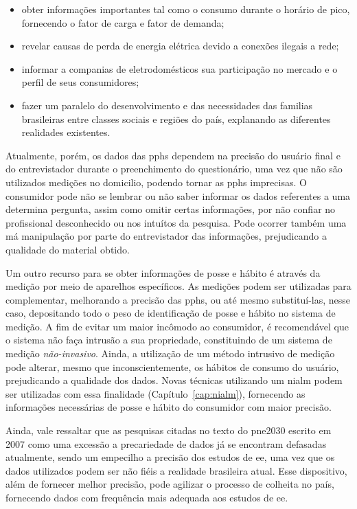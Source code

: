 \begin{itemize}
\item obter informações importantes tal como o consumo durante o horário de pico,
fornecendo o fator de carga e fator de demanda;
\item revelar causas de perda de energia elétrica devido a conexões ilegais a
rede;
\item informar a companias de eletrodomésticos sua participação no mercado e 
o perfil de seus consumidores;
\item fazer um paralelo do desenvolvimento e das necessidades das familias 
brasileiras entre classes sociais e regiões do país, explanando as 
diferentes realidades existentes.
\end{itemize}

Atualmente, porém, os dados das \glspl{pph} dependem
na precisão do usuário final e do entrevistador durante 
o preenchimento do questionário, uma vez que não são utilizados 
medições no domicilio, podendo tornar as \glspl{pph}
imprecisas. O consumidor pode não se lembrar ou não saber informar os dados
referentes a uma determina pergunta, assim como omitir certas informações, 
por não confiar no profissional desconhecido ou nos intuítos da pesquisa.
Pode ocorrer também uma má manipulação por parte do entrevistador das
informações, prejudicando a qualidade do material obtido.

Um outro recurso para se obter informações de posse e hábito é através da medição 
por meio de aparelhos específicos. As medições podem ser utilizadas para
complementar, melhorando a precisão das \glspl{pph}, ou até mesmo substituí-las,
nesse caso, depositando todo o peso de identificação de posse e hábito 
no sistema de medição. A fim de evitar um maior incômodo ao consumidor, é 
recomendável que o sistema não faça intrusão a sua propriedade, constituindo de 
um sistema de medição \emph{não-invasivo}. Ainda, a utilização de um método
intrusivo de medição pode alterar, mesmo que inconscientemente, os hábitos de consumo 
do usuário, prejudicando a qualidade dos dados.
Novas técnicas utilizando um \gls{nialm} podem ser 
utilizadas com essa finalidade (Capítulo~\ref{cap:nialm}), 
fornecendo as informações necessárias de posse e hábito do consumidor 
com maior precisão. 

Ainda, vale ressaltar que as pesquisas citadas no texto do \gls{pne2030} escrito 
em 2007 como uma excessão a precariedade de dados já se encontram defasadas 
atualmente, sendo um empecilho a precisão dos estudos de \gls{ee}, uma vez 
que os dados utilizados podem ser não fiéis a realidade brasileira atual. 
Esse dispositivo, além de fornecer melhor precisão, pode agilizar o processo 
de colheita no país, fornecendo dados com frequência mais adequada aos estudos 
de \gls{ee}. 
